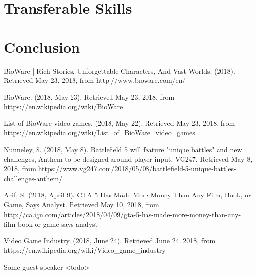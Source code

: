 \documentclass[10pt,letterpaper]{article}
\begin{document}
\section{Transferable Skills}\label{transferable-skills}

\section*{Conclusion}\label{conclusion}

\begin{thebibliography}{}

BioWare | Rich Stories, Unforgettable Characters, And Vast Worlds. (2018). Retrieved May 23, 2018, from http://www.bioware.com/en/ 

BioWare. (2018, May 23). Retrieved May 23, 2018, from https://en.wikipedia.org/wiki/BioWare

List of BioWare video games. (2018, May 22). Retrieved May 23, 2018, from https://en.wikipedia.org/wiki/List\_of\_BioWare\_video\_games

Nunneley, S. (2018, May 8). Battlefield 5 will feature "unique battles" and new challenges, Anthem to be designed around player input. VG247. Retrieved May 8, 2018, from https://www.vg247.com/2018/05/08/battlefield-5-unique-battles-challenges-anthem/

Arif, S. (2018, April 9). GTA 5 Has Made More Money Than Any Film, Book, or Game, Says Analyst. Retrieved May 10, 2018, from http://ca.ign.com/articles/2018/04/09/gta-5-has-made-more-money-than-any-film-book-or-game-says-analyst

Video Game Industry. (2018, June 24). Retrieved June 24. 2018, from https://en.wikipedia.org/wiki/Video\_game\_industry

Some guest speaker <todo>

\end{thebibliography}
\end{document}
